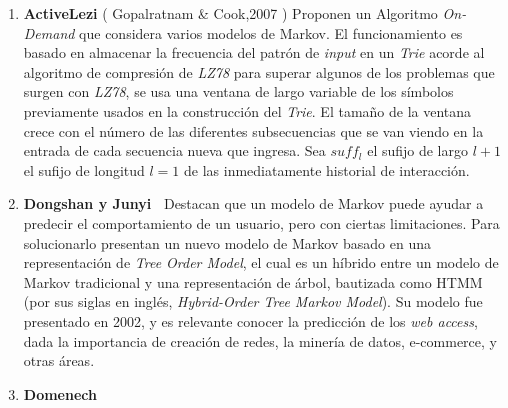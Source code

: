 \begin{enumerate}
{	%
	
	
	
	
	}
  \item \textbf{ActiveLezi} ( Gopalratnam \& Cook,2007 \etal\cite{Gopalratnam2007}) 
  {  
  Proponen un Algoritmo \emph{On-Demand} que considera varios modelos de Markov.  
  El funcionamiento es basado en almacenar la frecuencia del patrón de \emph{input} en un \emph{Trie} acorde al algoritmo de compresión de \emph{LZ78} para superar algunos de los problemas que surgen con \emph{LZ78}, se usa una ventana de largo variable de los símbolos previamente usados en la construcción del \emph{Trie}. El tamaño de la ventana crece con el número de las diferentes subsecuencias que se van viendo en la entrada de cada secuencia nueva que ingresa.  Sea $suff_{l}$  el sufijo de largo $l+1$ el sufijo de longitud $l=1$ de las inmediatamente historial de interacción.%
 }



  \item \textbf{Dongshan y Junyi~\cite{Dongshan2002} }
  {
	  Destacan que un modelo de Markov puede ayudar a predecir el comportamiento de un usuario, pero con ciertas limitaciones. Para solucionarlo presentan un nuevo modelo de Markov basado en una representación de \emph{Tree Order Model}, el cual es un híbrido entre un modelo de Markov tradicional y una representación de árbol, bautizada como HTMM (por sus siglas en inglés, \emph{Hybrid-Order Tree Markov Model}).
	  Su modelo fue presentado en 2002, y es relevante conocer la predicción de los \emph{web access}, dada la importancia de creación de redes, la minería de datos, e-commerce, y otras áreas.
	}
  \item \textbf{Domenech \etal~\cite{Domenech2006}}
  

\end{enumerate}

